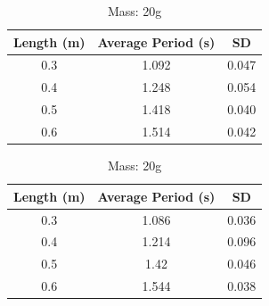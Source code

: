 \documentclass{article}
\begin{document}
\begin{table}[ht!]
    \centering
    \begin{subtable}[t]{0.4\textwidth}
        \centering
        \caption{Mass: 5.5g}
        \begin{tabular}{c||c||c}
            \toprule
            Length (m) & Average Period (s) & SD \\
            \midrule
            0.3 & 1.092 & 0.047\\
            \hline
            0.4 & 1.248 & 0.054\\
            \hline
            0.5 & 1.418 & 0.040\\
            \hline
            0.6 & 1.514 & 0.042\\
            \bottomrule
        \end{tabular}
        \label{tab:mass_5.5g_1}
    \end{subtable}
    \hfill
    \begin{subtable}[t]{0.4\textwidth}
        \centering
        \caption{Mass: 20g}
        \begin{tabular}{c||c||c}
            \toprule
            Length (m) & Average Period (s) & SD \\
            \midrule
            0.3 & 1.086 & 0.036\\
            \hline
            0.4 & 1.214 & 0.096\\
            \hline
            0.5 & 1.42 & 0.046\\
            \hline
            0.6 & 1.544 & 0.038\\
            \bottomrule
        \end{tabular}
        \label{tab:mass_5.5g_1}
    \end{subtable}
    \vspace{1em}


\end{table}
\end{document}

